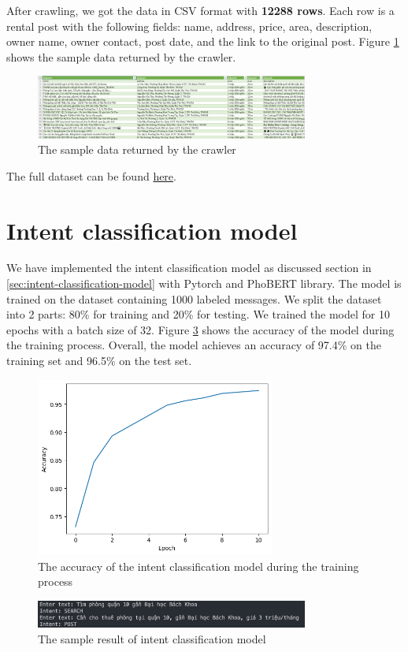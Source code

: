 After crawling, we got the data in CSV format with \textbf{12288 rows}. Each row is a rental post with the following fields: name, address, price, area, description, owner name, owner contact, post date, and the link to the original post. Figure \ref{fig:sample-crawling-data} shows the sample data returned by the crawler. 

\begin{figure}[ht]
    \centering
    \includegraphics[width=0.8\textwidth]{Images/9.Implementation/sample_crawling_data.png}
    \caption{The sample data returned by the crawler}
    \label{fig:sample-crawling-data}
\end{figure}

The full dataset can be found \href{https://www.kaggle.com/datasets/ef8770394a7256fd4e5270fd4a3692235a620fc85ac18128efd1b44d31aa5b1b}{here}.

\section{Intent classification model}
We have implemented the intent classification model as discussed section in \ref{sec:intent-classification-model} with Pytorch and PhoBERT library. The model is trained on the dataset containing 1000 labeled messages. We split the dataset into 2 parts: 80\% for training and 20\% for testing. We trained the model for 10 epochs with a batch size of 32. Figure \ref{fig:intent-classification-result} shows the accuracy of the model during the training process. Overall, the model achieves an accuracy of 97.4\% on the training set and 96.5\% on the test set. 

\begin{figure}[ht]
    \centering
    \includegraphics[width=0.7\textwidth]{Images/9.Implementation/intent_classifier_accuracy.png} 
    \caption{The accuracy of the intent classification model during the training process}
    \label{fig:intent-classification-accuracy}
\end{figure}

\begin{figure}[ht]
    \centering
    \includegraphics[width=0.8\textwidth]{Images/9.Implementation/intent_classifier_result.png}
    \caption{The sample result of intent classification model}
    \label{fig:intent-classification-result}
\end{figure}
